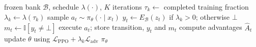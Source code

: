 \begin{algorithm}[t]
\caption{Training with executable advice. Count-PPO additionally stores
the count bonus; MiniGrid uses a separate intrinsic reward stream.}
\label{alg:training}
\begin{algorithmic}[1]
\Require frozen bank $\mathcal{B}$, schedule $\lambda(\cdot)$, $K$ iterations
  \State $\tau_k\gets$ completed training fraction
  \State $\lambda_k\gets\lambda(\tau_k)$
    \State sample $a_t\sim\pi_\theta(\cdot\mid x_t)$
    \State $y_t\gets E_{\mathcal{B}}(z_t)$ if $\lambda_k>0$; otherwise $\bot$
    \State $m_t\gets\mathbb{I}[y_t\ne\bot]$
    \State execute $a_t$; store transition, $y_t$ and $m_t$
  \EndFor
  \State compute advantages $\hat{A}_t$
    \State update $\theta$ using
    $\mathcal{L}_{\mathrm{PPO}}+\lambda_k\mathcal{L}_{\mathrm{adv}}$
  \EndFor
\EndFor
\State \Return $\pi_\theta$ 
\end{algorithmic}
\end{algorithm}
